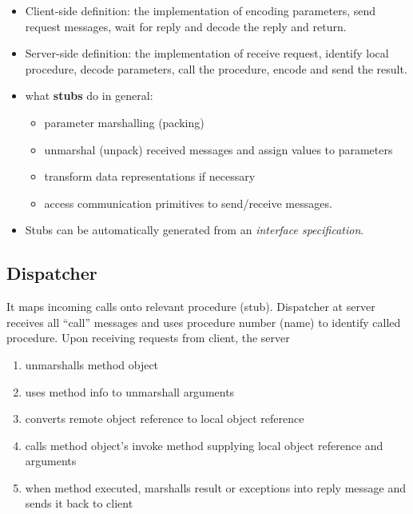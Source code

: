 \documentclass[twocolumn,landscape,10pt]{article}
\theoremstyle{definition}
\begin{document}
\begin{itemize}
    \item Client-side definition: the implementation of encoding parameters,
        send request messages, wait for reply and decode the reply and return.
    \item Server-side definition: the implementation of receive request,
        identify local procedure, decode parameters, call the
        procedure, encode and send the result.
    \item what \textbf{stubs} do in general:
        \begin{itemize}
            \item parameter marshalling (packing)
            \item unmarshal (unpack) received messages and assign values to
                parameters
            \item transform data representations if necessary
            \item access communication primitives to send/receive messages.
        \end{itemize} 
    \item Stubs can be automatically generated from an \emph{interface
        specification}.
\end{itemize} 

\subsection{Dispatcher}

It maps incoming calls onto relevant procedure (stub).
Dispatcher at server receives all ``call'' messages and uses procedure
number (name) to identify called procedure.
Upon receiving requests from client, the server
\begin{enumerate}
    \item unmarshalls method object
    \item uses method info to unmarshall arguments
    \item converts remote object reference to local object reference
    \item calls method object's invoke method supplying local object reference
        and arguments
    \item when method executed, marshalls result or exceptions into reply
        message and sends it back to client
\end{enumerate} 
\end{document}
